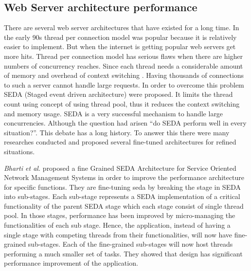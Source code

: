 \subsection{Web Server architecture performance}

There are several web server architectures that have existed for a long time. In the early 90s thread per connection model was popular because it is relatively easier to implement. But when the internet is getting popular web servers get more hits. Thread per connection model has serious flaws when there are higher numbers of concurrency reaches. Since each thread needs a considerable amount of memory and overhead of context switching \cite{seda}. Having thousands of connections to such a server cannot handle large requests. In order to overcome this problem SEDA (Staged event driven architecture) \cite{seda} were proposed. It limits the thread count using concept of using thread pool, thus it reduces the context switching and memory usage. SEDA is a very successful mechanism to handle large concurrencies. Although the question had arisen “do SEDA perform well in every situation?”. \cite{Scalable_Threads_for_Internet_Services,events_are_bad,event_deriven_programming_for_robust_software} This debate has a long history. To answer this there were many researches conducted and proposed several fine-tuned architectures for refined situations.

\textit{Bharti et al.} \cite{fine_grained_SEDA} proposed a fine Grained SEDA Architecture for Service Oriented Network Management Systems in order to improve the performance architecture for specific functions. They are fine-tuning \acrshort{seda} by breaking the stage in SEDA into sub-stages. Each sub-stage represents a SEDA implementation of a critical functionality of the parent SEDA stage which each stage consist of single thread pool. In those stages, performance has been improved by micro-managing the functionalities of each sub stage. Hence, the application, instead of having a single stage with competing threads from their functionalities, will now have fine-grained sub-stages. Each of the fine-grained sub-stages will now host threads performing a much smaller set of tasks. They showed that design has significant performance improvement of the application. 

